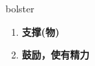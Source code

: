 
\begin{frame}
{\huge bolster}
\begin{center}
\begin{enumerate}\Large
  \item \textbf{支撑(物)}
  \item \textbf{鼓励，使有精力}
\end{enumerate}
\end{center}
\end{frame}
